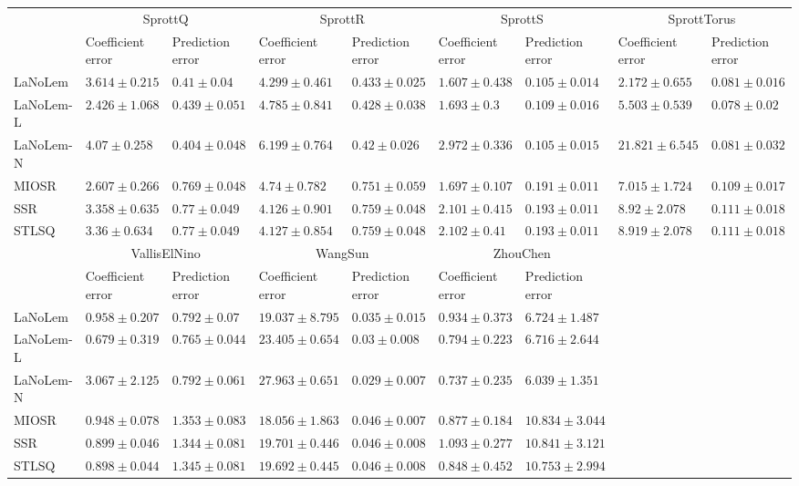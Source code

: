\begin{table*}
{\begin{tabular}{lllllllll}
 & \multicolumn{2}{c}{SprottQ} & \multicolumn{2}{c}{SprottR} & \multicolumn{2}{c}{SprottS} & \multicolumn{2}{c}{SprottTorus} \\
 & Coefficient error & Prediction error & Coefficient error & Prediction error & Coefficient error & Prediction error & Coefficient error & Prediction error \\
\midrule
LaNoLem & $3.614\pm 0.215$ & $0.41\pm 0.04$ & $4.299\pm 0.461$ & $0.433\pm 0.025$ & $\mathbf{1.607}\pm 0.438$ & $\mathbf{0.105}\pm 0.014$ & $\mathbf{2.172}\pm 0.655$ & $0.081\pm 0.016$ \\
LaNoLem-L & $\mathbf{2.426}\pm 1.068$ & $0.439\pm 0.051$ & $4.785\pm 0.841$ & $0.428\pm 0.038$ & $1.693\pm 0.3$ & $0.109\pm 0.016$ & $5.503\pm 0.539$ & $\mathbf{0.078}\pm 0.02$ \\
LaNoLem-N & $4.07\pm 0.258$ & $\mathbf{0.404}\pm 0.048$ & $6.199\pm 0.764$ & $\mathbf{0.42}\pm 0.026$ & $2.972\pm 0.336$ & $0.105\pm 0.015$ & $21.821\pm 6.545$ & $0.081\pm 0.032$ \\
MIOSR & $2.607\pm 0.266$ & $0.769\pm 0.048$ & $4.74\pm 0.782$ & $0.751\pm 0.059$ & $1.697\pm 0.107$ & $0.191\pm 0.011$ & $7.015\pm 1.724$ & $0.109\pm 0.017$ \\
SSR & $3.358\pm 0.635$ & $0.77\pm 0.049$ & $\mathbf{4.126}\pm 0.901$ & $0.759\pm 0.048$ & $2.101\pm 0.415$ & $0.193\pm 0.011$ & $8.92\pm 2.078$ & $0.111\pm 0.018$ \\
STLSQ & $3.36\pm 0.634$ & $0.77\pm 0.049$ & $4.127\pm 0.854$ & $0.759\pm 0.048$ & $2.102\pm 0.41$ & $0.193\pm 0.011$ & $8.919\pm 2.078$ & $0.111\pm 0.018$ \\

\midrule

 & \multicolumn{2}{c}{VallisElNino} & \multicolumn{2}{c}{WangSun} & \multicolumn{2}{c}{ZhouChen} \\
 & Coefficient error & Prediction error & Coefficient error & Prediction error & Coefficient error & Prediction error \\
\midrule
LaNoLem & $0.958\pm 0.207$ & $0.792\pm 0.07$ & $19.037\pm 8.795$ & $0.035\pm 0.015$ & $0.934\pm 0.373$ & $6.724\pm 1.487$ \\
LaNoLem-L & $\mathbf{0.679}\pm 0.319$ & $\mathbf{0.765}\pm 0.044$ & $23.405\pm 0.654$ & $0.03\pm 0.008$ & $0.794\pm 0.223$ & $6.716\pm 2.644$ \\
LaNoLem-N & $3.067\pm 2.125$ & $0.792\pm 0.061$ & $27.963\pm 0.651$ & $\mathbf{0.029}\pm 0.007$ & $\mathbf{0.737}\pm 0.235$ & $\mathbf{6.039}\pm 1.351$ \\
MIOSR & $0.948\pm 0.078$ & $1.353\pm 0.083$ & $\mathbf{18.056}\pm 1.863$ & $0.046\pm 0.007$ & $0.877\pm 0.184$ & $10.834\pm 3.044$ \\
SSR & $0.899\pm 0.046$ & $1.344\pm 0.081$ & $19.701\pm 0.446$ & $0.046\pm 0.008$ & $1.093\pm 0.277$ & $10.841\pm 3.121$ \\
STLSQ & $0.898\pm 0.044$ & $1.345\pm 0.081$ & $19.692\pm 0.445$ & $0.046\pm 0.008$ & $0.848\pm 0.452$ & $10.753\pm 2.994$ \\

\bottomrule
\end{tabular}
}
\end{table*}
